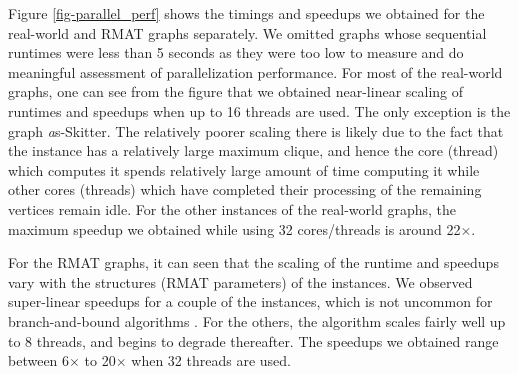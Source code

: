 Figure \ref{fig-parallel_perf} shows the timings and speedups we obtained for the real-world and RMAT graphs separately. We omitted graphs whose sequential runtimes were less than 5 seconds as they were too low to measure and do meaningful assessment of parallelization performance. For most of the real-world graphs, one can see from the figure that we obtained near-linear scaling of runtimes and speedups when up to 16 threads are used. The only exception is the graph 
{\emph as-Skitter}. The relatively poorer scaling there is likely due to the fact that the instance has a relatively large maximum clique, and hence the core (thread) which computes it spends relatively large amount of time computing it while other cores (threads) which have completed their processing of the remaining vertices remain idle. 
For the other instances of the real-world graphs, the maximum speedup we obtained 
while using 32 cores/threads is around 22$\times$. 

For the RMAT graphs, it can seen that the scaling of the runtime and speedups vary with the structures (RMAT parameters) of the instances. We observed super-linear speedups for a couple of the instances, which is not uncommon for branch-and-bound algorithms \cite{a6040618}. For the others, the algorithm scales fairly well up to 8 threads, and begins to
degrade thereafter. The speedups we obtained range between 6$\times$  to 20$\times$ when 32 threads are used.









